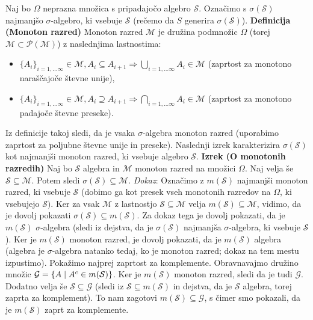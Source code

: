 \documentclass[mat1]{article}
\theoremstyle{definition}
\begin{document}
Naj bo $\Omega$ neprazna množica s pripadajočo algebro $\mathcal{S}$. Označimo s $\sigma(\mathcal{S})$ najmanjšo $\sigma$-algebro, ki vsebuje $\mathcal{S}$ (rečemo da $S$ generira $\sigma(\mathcal{S})$).
\newline
\newline
\textbf{Definicija (Monoton razred)}
Monoton razred $\mathcal{M}$ je družina podmnožic $\Omega$ (torej $\mathcal{M} \subset \mathcal{P(\mathcal{M})}$) z naslednjima lastnostima:
\begin{itemize}
\item  $\{A_i\}_{i=1,...\infty} \in \mathcal{M}, A_i \subseteq A_{i+1} \Rightarrow \bigcup_{i=1,...\infty} A_i \in \mathcal{M}$ (zaprtost za monotono naraščajoče števne unije),
\item  $\{A_i\}_{i=1,...\infty} \in \mathcal{M}, A_i \supseteq A_{i+1} \Rightarrow \bigcap_{i=1,...\infty} A_i \in \mathcal{M}$ (zaprtost za monotono padajoče števne preseke).
\end{itemize}
Iz definicije takoj sledi, da je vsaka $\sigma$-algebra monoton razred (uporabimo zaprtost za poljubne števne unije in preseke). Naslednji izrek karakterizira $\sigma(\mathcal{S})$ kot najmanjši monoton razred, ki vsebuje algebro $\mathcal{S}$.
\newline
\newline
\textbf{Izrek (O monotonih razredih)} Naj bo $\mathcal{S}$ algebra in $\mathcal{M}$ monoton razred na množici $\Omega$. Naj velja še $\mathcal{S} \subseteq \mathcal{M}$. Potem sledi $\sigma{(\mathcal{S})} \subseteq \mathcal{M}$.
\newline
\newline
\textit{Dokaz}: Označimo z $m(\mathcal{S})$ najmanjši monoton razred, ki vsebuje $\mathcal{S}$ (dobimo ga kot presek vseh monotonih razredov na $\Omega$, ki vsebujejo $\mathcal{S}).$ Ker za vsak $\mathcal{M}$ z lastnostjo $\mathcal{S} \subseteq \mathcal{M}$ velja $m(\mathcal{S}) \subseteq \mathcal{M}$, vidimo, da je dovolj pokazati $\sigma(\mathcal{S}) \subseteq m(\mathcal{S})$. Za dokaz tega je dovolj pokazati, da je $m(\mathcal{S}) $ $\sigma$-algebra (sledi iz dejstva, da je $\sigma(\mathcal{S})$ najmanjša $\sigma$-algebra, ki vsebuje $\mathcal{S}$). Ker je $m(\mathcal{S})$ monoton razred, je dovolj pokazati, da je $m(\mathcal{S})$ algebra (algebra je $\sigma$-algebra natanko tedaj, ko je monoton razred; dokaz na tem mestu izpustimo). 
\newline
Pokažimo najprej zaprtost za komplemente. Obravnavajmo družino množic $\mathcal{G} = \{ A\hspace{0.1cm}|\hspace{0.1cm} A^c \in m(\mathcal{S})\}$.  Ker je $m(\mathcal{S})$ monoton razred, sledi da je tudi $\mathcal{G}$. Dodatno velja še $\mathcal{S} \subseteq \mathcal{G}$ (sledi iz $\mathcal{S} \subseteq m(\mathcal{S})$ in dejstva, da je $\mathcal{S}$ algebra, torej zaprta za komplement). To nam zagotovi $m(\mathcal{S}) \subseteq \mathcal{G}$, s čimer smo pokazali, da je $m(\mathcal{S})$ zaprt za komplemente.
\end{document}

